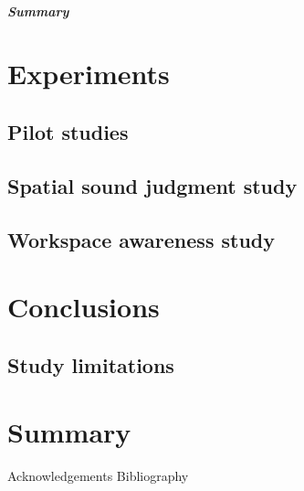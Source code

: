 \paragraph{Summary}
\chapter{Experiments}
\section{Pilot studies}
\section{Spatial sound judgment study}
\section{Workspace awareness study}



\chapter{Conclusions}
\section{Study limitations}
\chapter{Summary}

Acknowledgements 
Bibliography







\begin{comment}
Methodology: approach to solving the problem; chosen HCI methodology for the final evaluation - no idea
a. Chosen HCI evaluation methodology
\end{comment}


